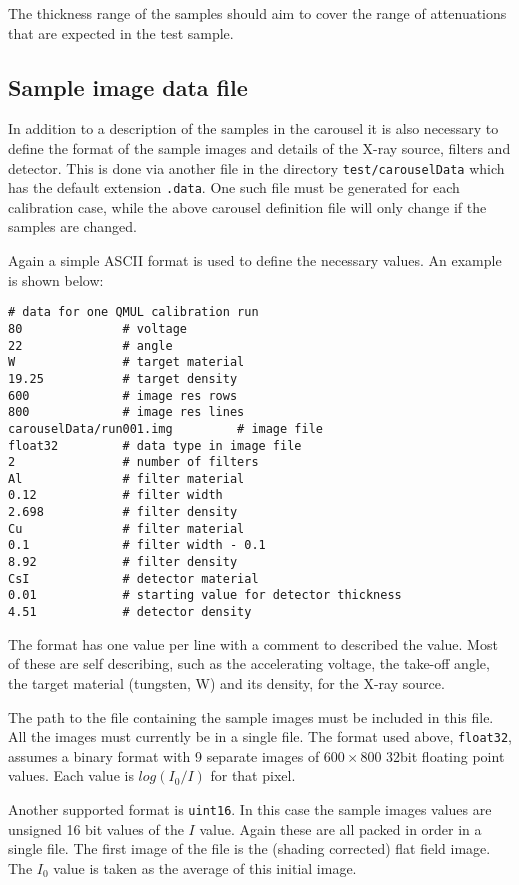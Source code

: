 \documentclass[a4paper,12pt]{article}
\begin{document}
The thickness range of the samples should aim to cover the range of attenuations that are expected in the test sample.

\subsection{Sample image data file}

In addition to a description of the samples in the carousel it is also necessary to define the format of the sample
images and details of the X-ray source, filters and detector.
This is done via another file in the directory \texttt{test/carouselData} which has the default extension \texttt{.data}.
One such file must be generated for each calibration case, while the above carousel definition file will only change
if the samples are changed.

Again a simple ASCII format is used to define the necessary values.
An example is shown below:
\begin{verbatim}
# data for one QMUL calibration run
80              # voltage
22              # angle
W               # target material
19.25           # target density
600             # image res rows
800             # image res lines
carouselData/run001.img         # image file
float32         # data type in image file
2               # number of filters
Al              # filter material
0.12            # filter width
2.698           # filter density
Cu              # filter material
0.1             # filter width - 0.1
8.92            # filter density
CsI             # detector material
0.01            # starting value for detector thickness
4.51            # detector density
\end{verbatim}

The format has one value per line with a comment to described the value.
Most of these are self describing, such as the accelerating voltage, the take-off angle,
the target material (tungsten, W) and its density, for the X-ray source.

The path to the file containing the sample images must be included in this file.
All the images must currently be in a single file.
The format used above, \texttt{float32}, assumes a binary format with 9 separate images of $600 \times 800$ 32bit floating
point values.
Each value is $log ( I_0 / I )$ for that pixel.

Another supported format is \texttt{uint16}. In this case the sample images values are unsigned 16 bit values of the $I$ value.
Again these are all packed in order in a single file. The first image of the file is the (shading corrected) flat field image.
The $I_0$ value is taken as the average of this initial image.
 
\end{document}
